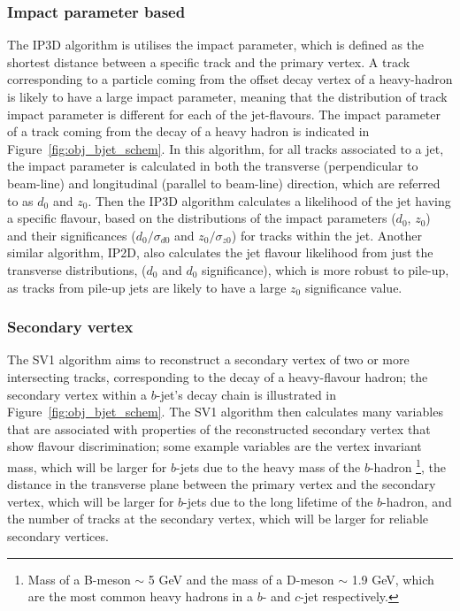 \subsubsection{Impact parameter based}
\label{sec:obj-bjets_IP}

The IP3D algorithm is utilises the impact parameter, which is defined as the shortest distance between a specific track and the primary vertex.
A track corresponding to a particle coming from the offset decay vertex of a heavy-hadron is likely to have a large impact parameter,
meaning that the distribution of track impact parameter is different for each of the jet-flavours.
The impact parameter of a track coming from the decay of a heavy hadron is indicated in Figure~\ref{fig:obj_bjet_schem}.
In this algorithm, for all tracks associated to a jet, the impact parameter is calculated in both the transverse (perpendicular to beam-line)
and longitudinal (parallel to beam-line) direction, which are referred to as $d_{0}$ and $z_{0}$.
Then the IP3D algorithm calculates a likelihood of the jet having a specific flavour, 
based on the distributions of the impact parameters ($d_{0}$, $z_{0}$) and their significances 
($d_{0}/\sigma _{d0}$ and  $z_{0}/\sigma_{z0}$) for tracks within the jet. 
Another similar algorithm, IP2D, also calculates the jet flavour likelihood from just the transverse distributions, ($d_{0}$ and $d_{0}$ significance), which is more
robust to pile-up, as tracks from pile-up jets are likely to have a large $z_{0}$ significance value.

\subsubsection{Secondary vertex}
\label{sec:obj-bjets_SV}


The SV1 algorithm aims to reconstruct a secondary vertex of two or more intersecting tracks, corresponding to the decay of a heavy-flavour hadron;
the secondary vertex within a $b$-jet's decay chain is illustrated in Figure~\ref{fig:obj_bjet_schem}.
The SV1 algorithm then calculates many variables that are associated with properties of the reconstructed secondary vertex that show flavour discrimination;
some example variables are the vertex invariant mass,
which will be larger for $b$-jets due to the heavy mass of the $b$-hadron
\footnote{Mass of a B-meson $\sim$ 5 GeV and the mass of a D-meson $\sim$ 1.9 GeV, which are the most common heavy hadrons in a $b$- and $c$-jet respectively.}, 
the distance in the transverse plane between the primary vertex and the secondary vertex, %
which will be larger for $b$-jets due to the long lifetime of the $b$-hadron,
and the number of tracks at the secondary vertex, which will be larger for reliable secondary vertices.

